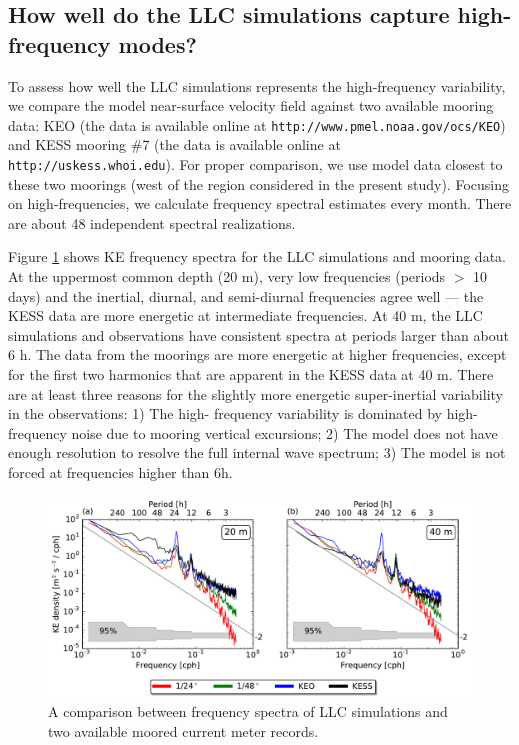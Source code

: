 \documentclass[grl]{agutex2015}
\begin{document}
\begin{article}
\subsection*{How well do the LLC simulations capture high-frequency modes?}
To assess how well the LLC simulations represents the high-frequency variability,
we compare the model near-surface velocity field against two available
mooring data: KEO (the data is available online at \texttt{http://www.pmel.noaa.gov/ocs/KEO})
and KESS mooring $\#$7 (the data is available online at \texttt{http://uskess.whoi.edu}).
For proper comparison, we use model data closest to these two moorings (west of
the region considered in the present study). Focusing on high-frequencies, we
calculate frequency spectral estimates every month. There are about 48 independent
spectral realizations.

Figure \ref{figA1} shows KE frequency spectra for the LLC simulations and mooring data.
At the uppermost common depth (20 m), very low frequencies (periods $>$ 10 days)
and the inertial, diurnal, and semi-diurnal frequencies agree well --- the KESS
data are more energetic at intermediate frequencies. At 40 m, the LLC simulations and observations
have consistent spectra at periods larger than about 6 h. The data from the moorings
are more energetic at higher frequencies,
except for the first two harmonics that are apparent in the KESS data at 40 m.
There are at least three reasons for the slightly more energetic super-inertial
variability in the observations: 1) The high-
frequency variability is dominated by high-frequency noise due to mooring vertical
excursions; 2) The model does not have enough resolution to resolve the full internal
wave spectrum; 3) The model is not forced at frequencies higher than 6h.

\begin{figure}[ht]
   \begin{center}
     \includegraphics[width=.9\textwidth]{figs/figA1.pdf}
  \caption{A comparison between frequency spectra of LLC simulations and two
  available moored current meter records.}
  \label{figA1}
  \end{center}
\end{figure}


\end{article}
\end{document}
